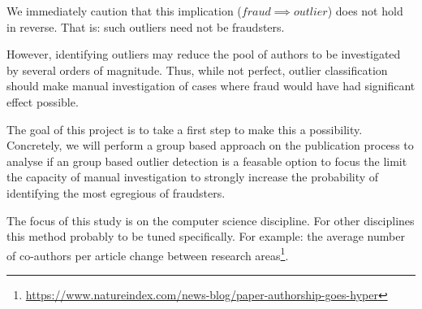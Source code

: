 \documentclass{ou-report}
\newcommand{\outline}[1]{{\color{blue} #1}}
\begin{document}
We immediately caution that this implication ($fraud \implies outlier$) does 
not hold in reverse. That is: such outliers need not be fraudsters. 

However, identifying outliers may reduce the pool of authors to be investigated
by several orders of magnitude. Thus, while not perfect, outlier classification
should make manual investigation of cases where fraud would have had significant
effect possible.

The goal of this project is to take a first step to make this a possibility.
Concretely, we will perform a group based approach on the publication process
to analyse if an group based outlier detection is a feasable option to focus
the limit the capacity of manual investigation to strongly 
increase the probability of identifying the most egregious of fraudsters. 

The focus of this study is on the computer science 
discipline. For other disciplines this method probably to be tuned specifically. 
For example: the average number of co-authors per article change between research 
areas\footnote{\url{https://www.natureindex.com/news-blog/paper-authorship-goes-hyper}}.

        
\end{document}
